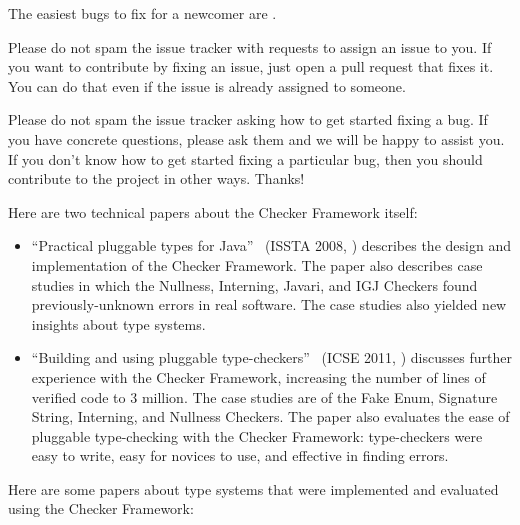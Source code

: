 The easiest bugs to fix for a newcomer are
.

Please do not spam the issue tracker with requests to assign an issue to
you.  If you want to contribute by fixing an issue, just open a pull
request that fixes it.  You can do that even if the issue is already
assigned to someone.

Please do not spam the issue tracker asking how to get started fixing a
bug.  If you have concrete questions, please ask them and we will be happy
to assist you.  If you don't know how to get started fixing a particular
bug, then you should contribute to the project in other ways.  Thanks!



Here are two technical papers about the Checker Framework itself:

\begin{itemize}
\item
``Practical pluggable types for Java''~\cite{PapiACPE2008}
(ISSTA 2008, )
describes the design and implementation of the Checker Framework.
The paper also describes case
studies in which the Nullness, Interning, Javari, and IGJ Checkers found
previously-unknown errors in real software.
The case studies also yielded new insights about type systems.

\item
``Building and using pluggable
type-checkers''~\cite{DietlDEMS2011}
(ICSE 2011, )
discusses further experience with the Checker Framework, increasing the
number of lines of verified code to 3 million.  The case studies are of the
Fake Enum, Signature String, Interning, and Nullness Checkers.
The paper also evaluates the ease
of pluggable type-checking with the Checker Framework:  type-checkers
were easy to write, easy for novices to use, and effective in finding
errors.
\end{itemize}

Here are some papers about type systems that were implemented and evaluated
using the Checker Framework:

